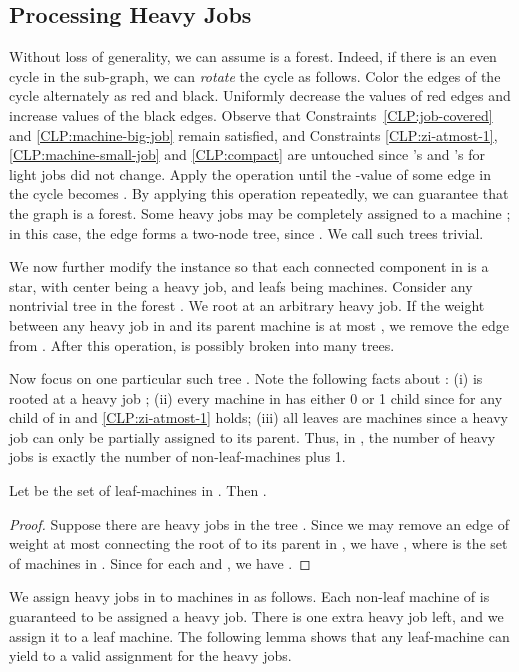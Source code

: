 \documentclass[11pt]{article}
\begin{document}
\subsection{Processing Heavy Jobs}
Without loss of generality, we can assume  is a forest. Indeed, if there is an even cycle in the sub-graph, we can \emph{rotate} the cycle as follows. Color the edges of the cycle alternately as red and black. Uniformly decrease the  values of red edges and increase  values of the black edges. Observe that Constraints~\eqref{CLP:job-covered} and \eqref{CLP:machine-big-job} remain satisfied, and Constraints \eqref{CLP:zi-atmost-1}, \eqref{CLP:machine-small-job}  and \eqref{CLP:compact} are untouched since 's and 's for light jobs  did not change.  Apply the operation until the -value of some edge in the cycle becomes .  By applying this operation repeatedly, we can guarantee that the graph  is a forest. 
Some heavy jobs  may be completely assigned to a machine ; in this case, the edge  forms a two-node tree, since . We call such trees trivial.

We now further modify the instance so that each connected component in  is a star, with center being a heavy job, and leafs being machines.  Consider any nontrivial tree  in the forest . We root  at an arbitrary heavy job.  If the weight  between any heavy job  in  and its parent machine  is at most , we remove the edge  from .  After this operation,  is possibly broken into many trees.

Now focus on one particular such tree . Note the following facts about : (i)  is rooted at a heavy job ; (ii) every machine  in  has either 0 or 1 child since  for any child  of  in  and \eqref{CLP:zi-atmost-1} holds; (iii) all leaves are machines since a heavy job can only be partially assigned to its parent.  Thus, in , the number of heavy jobs is exactly the number of non-leaf-machines plus 1. 
\begin{lemma}
\label{lem:sum-z-is-large}
Let  be the set of leaf-machines in . Then .
\end{lemma}
\begin{proof}
Suppose there are  heavy jobs in the tree . Since we may remove an edge of weight at most  connecting the root of  to its parent in , we have , where  is the set of machines in .  Since  for each  and , we have .
\end{proof}

We assign heavy jobs in  to machines in  as follows. Each non-leaf machine of  is guaranteed to be assigned a heavy job.  There is one extra heavy job left, and we assign it to a leaf machine.  The following lemma shows that any leaf-machine can yield to a valid assignment for the heavy jobs.
\end{document}
